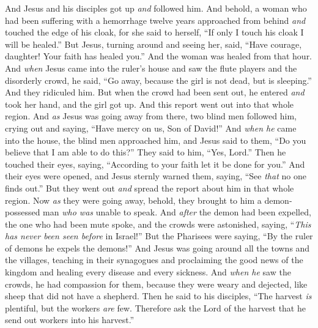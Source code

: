 \begin{biblechapter}
\verse And Jesus and his disciples got up \textit{and} followed him.
\verse And behold, a woman who had been suffering with a hemorrhage twelve years approached from behind \textit{and} touched the edge of his cloak,
\verse for she said to herself, “If only I touch his cloak I will be healed.”
\verse But Jesus, turning around and seeing her, said, “Have courage, daughter! Your faith has healed you.” And the woman was healed from that hour.
\verse And \textit{when} Jesus came into the ruler’s house and saw the flute players and the disorderly crowd,
\verse he said, “Go away, because the girl is not dead, but is sleeping.” And they ridiculed him.
\verse But when the crowd had been sent out, he entered \textit{and} took her hand, and the girl got up.
\verse And this report went out into that whole region.
 And \textit{as} Jesus was going away from there, two blind men followed him, crying out and saying, “Have mercy on us, Son of David!”
\verse And \textit{when he} came into the house, the blind men approached him, and Jesus said to them, “Do you believe that I am able to do this?” They said to him, “Yes, Lord.”
\verse Then he touched their eyes, saying, “According to your faith let it be done for you.”
\verse And their eyes were opened, and Jesus sternly warned them, saying, “See \textit{that} no one finds out.”
\verse But they went out \textit{and} spread the report about him in that whole region.
 Now \textit{as} they were going away, behold, they brought to him a demon-possessed man \textit{who was} unable to speak.
\verse And \textit{after} the demon had been expelled, the one who had been mute spoke, and the crowds were astonished, saying, “\textit{This has never been seen before} in Israel!”
\verse But the Pharisees were saying, “By the ruler of demons he expels the demons!”
 And Jesus was going around all the towns and the villages, teaching in their synagogues and proclaiming the good news of the kingdom and healing every disease and every sickness.
\verse And \textit{when he} saw the crowds, he had compassion for them, because they were weary and dejected, like sheep that did not have a shepherd.
\verse Then he said to his disciples, “The harvest \textit{is} plentiful, but the workers \textit{are} few.
\verse Therefore ask the Lord of the harvest that he send out workers into his harvest.”
\end{biblechapter}

